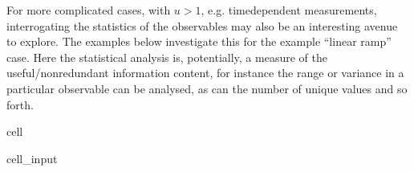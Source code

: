 \documentclass[letterpaper,table,10pt,english]{jupyterBook}
\begin{document}
\sphinxAtStartPar
For more complicated cases, with \(u>1\), e.g. time\sphinxhyphen{}dependent measurements, interrogating the statistics of the observables may also be an interesting avenue to explore. The examples below investigate this for the example “linear ramp” {\hyperref[\detokenize{backmatter/glossary:term-ADMs}]{}} case. Here the statistical analysis is, potentially, a measure of the useful/non\sphinxhyphen{}redundant information content, for instance the range or variance in a particular observable can be analysed, as can the number of unique values and so forth.

\begin{sphinxuseclass}{cell}\begin{sphinxVerbatimInput}

\begin{sphinxuseclass}{cell_input}
\begin{sphinxVerbatim}[commandchars=\\\{\}]
    
                                                  

\end{sphinxVerbatim}

\end{sphinxuseclass}\end{sphinxVerbatimInput}
\begin{sphinxVerbatimOutput}


\end{sphinxVerbatimOutput}
\end{sphinxuseclass}
\end{document}
